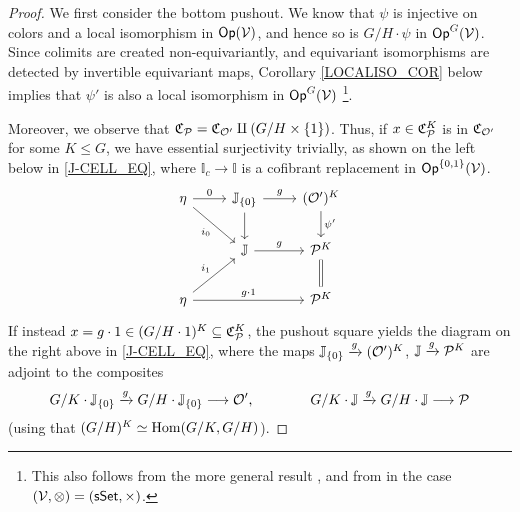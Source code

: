 \documentclass[a4paper,10pt
,draft
]{article}%
\renewcommand{\F}{\mathcal F}
\newcommand{\I}{\mathbb I}
\newcommand{\J}{\mathbb J}
\renewcommand{\1}{\eta}%
\begin{document}
\begin{proof}
      We first consider the bottom pushout.
      We know that $\psi$ is injective on colors and a local isomorphism in $\Op(\V)$,
      and hence so is $G/H \cdot \psi$ in $\Op^G(\V)$.
      Since colimits are created non-equivariantly, and equivariant isomorphisms are detected by invertible equivariant maps,
      Corollary \ref{LOCALISO_COR} below implies that $\psi'$ is also a local isomorphism in $\Op^G(\V)$ \footnote{
        This also follows from the more general result \cite[Prop. B.22]{Cav},
        and from \cite[Prop. 1.28]{CM13b} in the case $(\V, \otimes) = (\sSet, \times)$.
      }.
      
      Moreover, we observe that $\C_{\P} = \C_{\O'} \amalg (G/H \times \set{1})$.
      Thus, if $x \in \C_{\P}^K$ is in $\C_{\O'}$ for some $K \leq G$, we have essential surjectivity trivially,
      as shown on the left below in \eqref{J-CELL_EQ},
      where $\I_c \to \I$ is a cofibrant replacement in $\Op^{\set{0,1}}(\V)$.
      \begin{equation}
            \label{J-CELL_EQ}
            \begin{tikzcd}
                  \1 \arrow[r, "0"] \arrow[dr, "i_0"']
                  &
                  \J_{\set{0}} \arrow[d] \arrow[r, "g"]
                  &
                  (\O')^K \arrow[d, "{\psi'}"]
                  \\
                  &
                  \J \arrow[r, "g"]
                  &
                  \P^K \arrow[d, equal]
                  \\
                  \1 \arrow[rr, "g \cdot 1"] \arrow[ur, "i_1"]
                  &&
                  \P^K
            \end{tikzcd}
      \end{equation}
      If instead $x  = g \cdot 1 \in (G/H \cdot 1)^K \subseteq \mathfrak C_\P^K$,
      the pushout square yields the diagram on the right above in \eqref{J-CELL_EQ},
      where the maps $\J_{\set{0}} \xrightarrow{g} (\O')^K$, $\J \xrightarrow{g} \P^K$ are adjoint to the composites
      \begin{equation}
            G/K \cdot \J_{\set{0}} \xrightarrow{g} G/H \cdot \J_{\set{0}} \longto \O',
            \qquad \qquad
            G/K \cdot \J \xrightarrow{g} G/H \cdot \J \longto \P
      \end{equation}
      (using that $(G/H)^K \simeq \Hom(G/K, G/H)$).

\end{proof}
\end{document}
